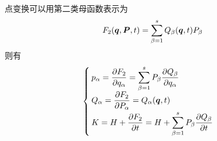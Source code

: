 \begin{example}[点变换]
点变换可以用第二类母函数表示为
\begin{equation*}
	F_2(\boldsymbol{q},\boldsymbol{P},t) = \sum_{\beta=1}^s Q_\beta(\boldsymbol{q},t) P_\beta
\end{equation*}
则有
\begin{equation*}
	\begin{cases}
		\displaystyle p_\alpha = \frac{\partial F_2}{\partial q_\alpha} = \sum_{\beta=1}^s P_\beta \frac{\partial Q_\beta}{\partial q_\alpha} \\[1.5ex]
		\displaystyle Q_\alpha = \frac{\partial F_2}{\partial P_\alpha} = Q_\alpha(\boldsymbol{q},t) \\[1.5ex]
		\displaystyle K = H + \frac{\partial F_2}{\partial t} = H + \sum_{\beta=1}^s P_\beta \frac{\partial Q_\beta}{\partial t}
	\end{cases}
\end{equation*}
\end{example}

